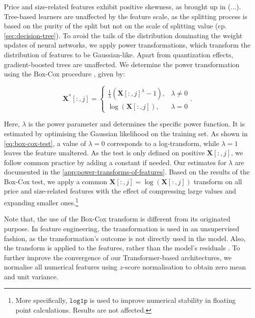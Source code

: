Price and size-related features exhibit positive skewness, as brought up in (...). Tree-based learners are unaffected by the feature scale, as the splitting process is based on the purity of the split but not on the scale of splitting value (cp. \cref{sec:decision-tree}). To avoid the tails of the distribution dominating the weight updates of neural networks, we apply power transformations, which transform the distribution of features to be Gaussian-like. Apart from quantization effects, gradient-boosted trees are unaffected. We determine the power transformation using the Box-Cox procedure \autocite[][214]{boxAnalysisTransformations2022}, given by:

\begin{equation}
    \mathbf{X}^{*}\left[:,j\right]= \begin{cases}\frac{1}{\lambda}(\mathbf{X}\left[:,j\right]^\lambda-1), & \lambda \neq 0 \\ \log (\mathbf{X}\left[:,j\right]),& \lambda=0\end{cases}.
    \label{eq:box-cox-test}
\end{equation}

Here, $\lambda$ is the power parameter and determines the specific power function. It is estimated by optimising the Gaussian likelihood on the training set. As shown in \cref{eq:box-cox-test}, a value of $\lambda=0$ corresponds to a log-transform, while $\lambda=1$ leaves the feature unaltered. As the test is only defined on positive $\mathbf{X}\left[:,j\right]$, we follow common practice by adding a constant if needed. Our estimates for $\lambda$ are documented in the \cref{app:power-transforms-of-features}. Based on the results of the Box-Cox test, we apply a common $\mathbf{X}\left[:,j\right]=\log(\mathbf{X}\left[:,j\right])$ transform on all price and size-related features with the effect of compressing large values and expanding smaller ones.\footnote{More specifically, $\mathtt{log1p}$ is used to improve numerical stability in floating point calculations. Results are not affected.}

Note that, the use of the Box-Cox transform is different from its originated purpose. In feature engineering, the transformation is used in an unsupervised fashion, as the transformation's outcome is not directly used in the model. Also, the transform is applied to the features, rather than the model's residuals \autocite[122]{kuhnFeatureEngineeringSelection2020}.
To further improve the convergence of our Transformer-based architectures, we normalise all numerical features using $z$-score normalisation to obtain zero mean and unit variance.

